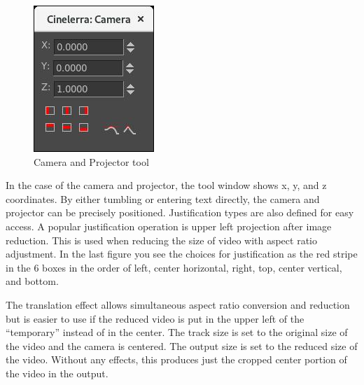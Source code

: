 \begin{figure} 
	\vspace{-4ex}
    \includegraphics[width=0.9\linewidth]{images/camera_tool.png}
    \caption{Camera and Projector tool}
    \label{fig:camera_tool}
\end{figure}

In the case of the camera and projector, the tool window shows x, y, and z coordinates. 
By either tumbling or entering text directly, the camera and projector can be precisely positioned.  
Justification types are also defined for easy access. 
A popular justification operation is upper left projection after image reduction. 
This is used when reducing the size of video with aspect ratio adjustment.  
In the last figure you see the choices for justification as the red stripe in the 6 boxes in the order of left, center horizontal, right, top, center vertical, and bottom.

The translation effect allows simultaneous aspect ratio conversion and reduction but is easier to use if the reduced video is put in the upper left of the “temporary” instead of in the center. 
The track size is set to the original size of the video and the camera is centered. 
The output size is set to the reduced size of the video. 
Without any effects, this produces just the cropped center portion of the video in the output.

